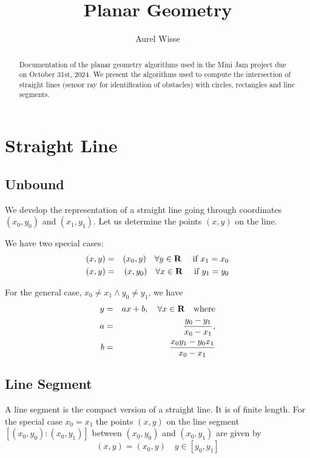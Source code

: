 \documentclass[11pt]{article}
\newcommand{\Rb}{{\bf{R}}}
\begin{document}
%
%
\title{Planar Geometry}
\author{Aurel Wisse}
\maketitle
%
%
\begin{abstract}
Documentation of the planar geometry algorithms used in the
Mini Jam project due on October 31st, 2024. We present the algorithms used to
compute the intersection of straight lines (sensor ray for identification 
of obstacles) with circles, rectangles and line segments.
\end{abstract}

%
\section{Straight Line}
\label{sec-straight-line}

\subsection{Unbound}
\label{sec:unbound}
We develop the representation of a straight line going through
coordinates $(x_0, y_0)$ and $(x_1, y_1)$. Let us determine the points $(x, 
y)$ on the line.

We have two special cases: 
\begin{eqnarray}
    (x, y) &=& (x_0, y)\quad\forall y\in\Rb\quad \text{ if } x_1 = x_0
    \label{eq-line-x1x0} \\
    (x, y) &=& (x, y_0)\quad\forall x\in\Rb\quad \text{ if } y_1 = y_0
    \label{eq-line-y1y0}
\end{eqnarray}

For the general case, $x_0 \neq x_1 \land y_0 \neq y_1$, we have
\begin{eqnarray}
    y &=& ax+b,\quad \forall x\in\Rb\quad \text{where}\label{eq-line-general}\\
    a &=& \frac{y_0 - y_1}{x_0 - x_1}, \notag \\
    b &=& \frac{x_0 y_1 - y_0 x_1}{x_0 - x_1} \notag
\end{eqnarray}

\subsection{Line Segment}
\label{sec-line-segment}
A line segment is the compact version of a straight line. It is of finite
length. For the special case $x_0 = x_1$ the points $(x, y)$ on the line 
segment $[(x_0, y_0):(x_0, y_1)]$ between $(x_0, y_0)$ and $(x_0, y_1)$ are 
given by
\begin{equation}
    (x, y) = (x_0, y)\quad y\in [y_0, y_1]\label{eq-seg-x1x0}
\end{equation}
\end{document}
